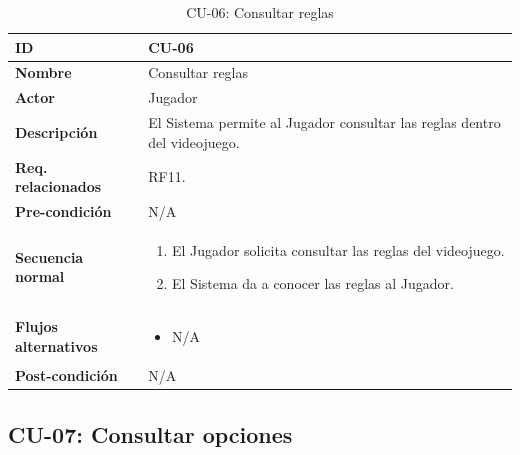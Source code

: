 \begin{table}[H]
	\centering
	\begin{tabular}{|p{3cm}|p{14cm}|}
		\hline \textbf{ID} & CU-06 \\
		\hline \textbf{Nombre} & Consultar reglas \\
		\hline \textbf{Actor} & Jugador \\
		\hline \textbf{Descripción} & El Sistema permite al Jugador consultar las reglas dentro del videojuego. \\
		\hline \textbf{Req. relacionados} & RF11. \\
		\hline \textbf{Pre-condición} & N/A \\
		\hline
		\textbf{Secuencia normal} &
		\begin{enumerate}[nosep, before=\vspace{-0.4\baselineskip}]
			\item El Jugador solicita consultar las reglas del videojuego.
			\item El Sistema da a conocer las reglas al Jugador.
		\end{enumerate} \\
		\hline
		\textbf{Flujos alternativos} &
		\begin{itemize}[nosep, before=\vspace{-0.4\baselineskip}]
			\item N/A
		\end{itemize} \\
		\hline \textbf{Post-condición} & N/A \\
		\hline
	\end{tabular}
	\caption{CU-06: Consultar reglas}
	\label{tab:cu06}
\end{table}

\clearpage


\subsection{CU-07: Consultar opciones}


